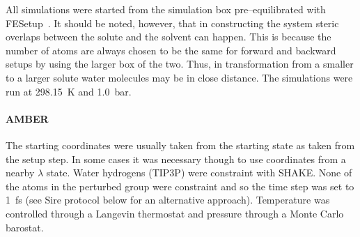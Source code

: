 \documentclass[journal=jctcce,manuscript=article]{achemso}
\begin{document}
All simulations were started from the simulation box pre--equilibrated with
FESetup~\cite{loeffler_fesetup:_2015}.  It should be noted, however, that in
constructing the system steric overlaps between the solute and the solvent can
happen.  This is because the number of atoms are always chosen to be the same
for forward and backward setups by using the larger box of the two.  Thus, in
transformation from a smaller to a larger solute water molecules may be in
close distance.  The simulations were run at \SI{298.15}{K} and \SI{1.0}{bar}.

\paragraph{AMBER} The starting coordinates were usually taken from the
starting state as taken from the setup step.  In some cases it was
necessary though to use coordinates from a nearby $\lambda$ state.
Water hydrogens (TIP3P) were constraint with SHAKE.  None of the atoms
in the perturbed group were constraint and so the time step was set to
\SI{1}{fs} (see Sire protocol below for an alternative approach).
Temperature was controlled through a Langevin thermostat and pressure
through a Monte Carlo barostat.
\end{document}
